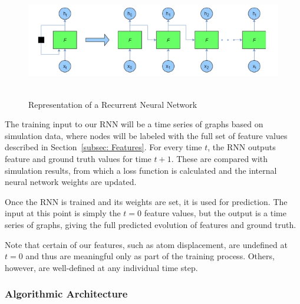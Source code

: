 \begin{figure}
    \centering
    \noindent
\includegraphics[width=12cm , height = 5cm]{picture/rnn.PNG}
    \caption{Representation of a Recurrent Neural Network}
    \label{fig:rnn}
\end{figure}


The training input to our RNN will be a time series of graphs based on simulation data, where nodes will be labeled with the full set of feature values described in Section~\ref{subsec: Features}.  For every time $t$, the RNN outputs feature and ground truth values for time $t+1$.  These are compared with simulation results, from which a loss function is calculated and the internal neural network weights are updated.

Once the RNN is trained and its weights are set, it is used for prediction.  The input at this point is simply the $t=0$ feature values, but the output is a time series of graphs, giving the full predicted evolution of features and ground truth.

Note that certain of our features, such as atom displacement, are undefined at $t=0$ and thus are meaningful only as part of the training process.  Others, however, are well-defined at any individual time step.



\subsubsection{Algorithmic Architecture}

